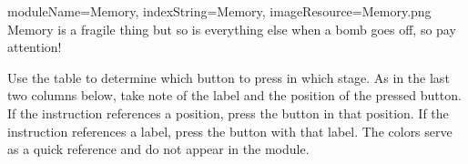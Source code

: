 \documentclass{../../ktane-mod}
\begin{document}
\begin{module}{
  moduleName=Memory,
  indexString=Memory,
  imageResource=Memory.png
}
{
  Memory is a fragile thing but so is everything else when a bomb goes off, so pay attention!
}
  \begin{bulletlist}
  \end{bulletlist}

  Use the table to determine which button to press in which stage.
  As in the last two columns below, take note of the label and the position of the pressed button.
  If the instruction references a position, press the button in that position.
  If the instruction references a label, press the button with that label.
  The colors serve as a quick reference and do not appear in the module.


\end{module}
\end{document}
